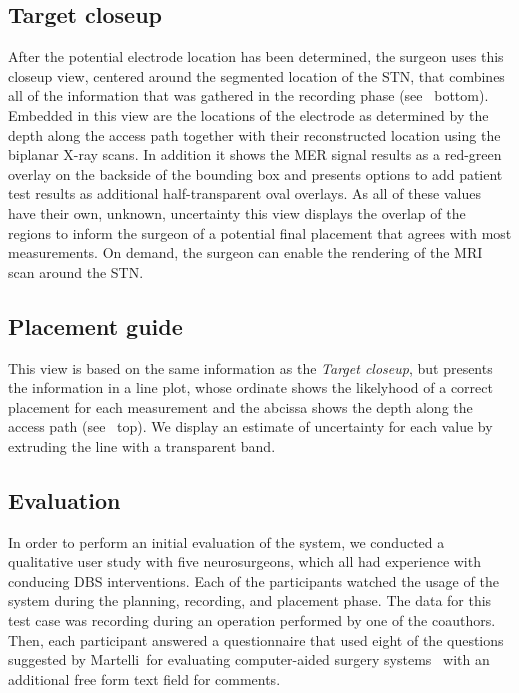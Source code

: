 \subsection{Target closeup} \label{contributions:dbs:target}
After the potential electrode location has been determined, the surgeon uses this closeup view, centered around the segmented location of the STN, that combines all of the information that was gathered in the recording phase (see~ bottom). Embedded in this view are the locations of the electrode as determined by the depth along the access path together with their reconstructed location using the biplanar X-ray scans. In addition it shows the MER signal results as a red-green overlay on the backside of the bounding box and presents options to add patient test results as additional half-transparent oval overlays. As all of these values have their own, unknown, uncertainty this view displays the overlap of the regions to inform the surgeon of a potential final placement that agrees with most measurements. On demand, the surgeon can enable the rendering of the MRI scan around the STN.

\subsection{Placement guide} \label{contributions:dbs:placement}
This view is based on the same information as the \emph{Target closeup}, but presents the information in a line plot, whose ordinate shows the likelyhood of a correct placement for each measurement and the abcissa shows the depth along the access path (see~ top). We display an estimate of uncertainty for each value by extruding the line with a transparent band.

\subsection{Evaluation} \label{contributions:dbs:evaluation}
In order to perform an initial evaluation of the system, we conducted a qualitative user study with five neurosurgeons, which all had experience with conducing DBS interventions. Each of the participants watched the usage of the system during the planning, recording, and placement phase. The data for this test case was recording during an operation performed by one of the coauthors. Then, each participant answered a questionnaire that used eight of the questions suggested by Martelli~\etal for evaluating computer-aided surgery systems~\cite{martelli2003criteria} with an additional free form text field for comments.

